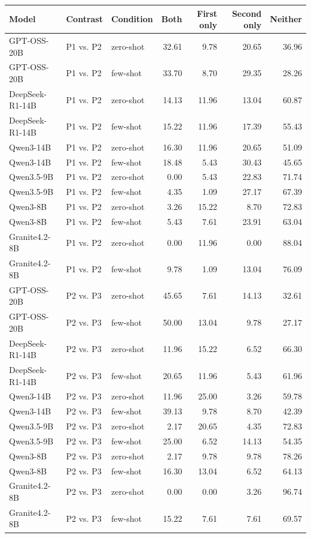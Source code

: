 \begin{tabularx}{\textwidth}{llXrrrr}
\toprule
Model & Contrast & Condition & Both & First only & Second only & Neither \\
\midrule
GPT-OSS-20B & P1 vs. P2 & zero-shot & 32.61 & 9.78 & 20.65 & 36.96 \\
GPT-OSS-20B & P1 vs. P2 & few-shot & 33.70 & 8.70 & 29.35 & 28.26 \\
DeepSeek-R1-14B & P1 vs. P2 & zero-shot & 14.13 & 11.96 & 13.04 & 60.87 \\
DeepSeek-R1-14B & P1 vs. P2 & few-shot & 15.22 & 11.96 & 17.39 & 55.43 \\
Qwen3-14B & P1 vs. P2 & zero-shot & 16.30 & 11.96 & 20.65 & 51.09 \\
Qwen3-14B & P1 vs. P2 & few-shot & 18.48 & 5.43 & 30.43 & 45.65 \\
Qwen3.5-9B & P1 vs. P2 & zero-shot & 0.00 & 5.43 & 22.83 & 71.74 \\
Qwen3.5-9B & P1 vs. P2 & few-shot & 4.35 & 1.09 & 27.17 & 67.39 \\
Qwen3-8B & P1 vs. P2 & zero-shot & 3.26 & 15.22 & 8.70 & 72.83 \\
Qwen3-8B & P1 vs. P2 & few-shot & 5.43 & 7.61 & 23.91 & 63.04 \\
Granite4.2-8B & P1 vs. P2 & zero-shot & 0.00 & 11.96 & 0.00 & 88.04 \\
Granite4.2-8B & P1 vs. P2 & few-shot & 9.78 & 1.09 & 13.04 & 76.09 \\
GPT-OSS-20B & P2 vs. P3 & zero-shot & 45.65 & 7.61 & 14.13 & 32.61 \\
GPT-OSS-20B & P2 vs. P3 & few-shot & 50.00 & 13.04 & 9.78 & 27.17 \\
DeepSeek-R1-14B & P2 vs. P3 & zero-shot & 11.96 & 15.22 & 6.52 & 66.30 \\
DeepSeek-R1-14B & P2 vs. P3 & few-shot & 20.65 & 11.96 & 5.43 & 61.96 \\
Qwen3-14B & P2 vs. P3 & zero-shot & 11.96 & 25.00 & 3.26 & 59.78 \\
Qwen3-14B & P2 vs. P3 & few-shot & 39.13 & 9.78 & 8.70 & 42.39 \\
Qwen3.5-9B & P2 vs. P3 & zero-shot & 2.17 & 20.65 & 4.35 & 72.83 \\
Qwen3.5-9B & P2 vs. P3 & few-shot & 25.00 & 6.52 & 14.13 & 54.35 \\
Qwen3-8B & P2 vs. P3 & zero-shot & 2.17 & 9.78 & 9.78 & 78.26 \\
Qwen3-8B & P2 vs. P3 & few-shot & 16.30 & 13.04 & 6.52 & 64.13 \\
Granite4.2-8B & P2 vs. P3 & zero-shot & 0.00 & 0.00 & 3.26 & 96.74 \\
Granite4.2-8B & P2 vs. P3 & few-shot & 15.22 & 7.61 & 7.61 & 69.57 \\
\bottomrule
\end{tabularx}
